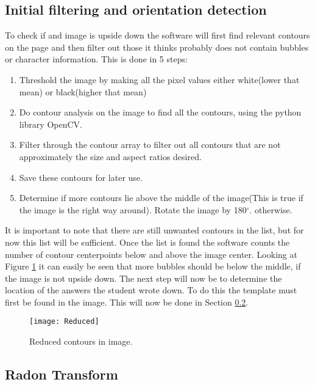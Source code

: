 \subsection{Initial filtering and orientation detection}
\label{sec:InitImageFilter}

To check if and image is upside down the software will first find relevant contours on the page and then filter out those it thinks probably does not contain bubbles or character information. This is done in 5 steps:

\begin{enumerate}
\item Threshold the image by making all the pixel values either white(lower that mean) or black(higher that mean)
\item Do contour analysis on the image to find all the contours, using the python library OpenCV.
\item Filter through the contour array to filter out all contours that are not approximately the size and aspect ratios desired.
\item Save these contours for later use.
\item Determine if more contours lie above the middle of the image(This is true if the image is the right way around). Rotate the image by 180$^{\circ}$. otherwise.
\end{enumerate}

It is important to note that there are still unwanted contours in the list, but for now this list will be sufficient. Once the list is found the software counts the number of contour centerpoints below and above the image center. Looking at Figure \ref{fig:reduced} it can easily be seen that more bubbles should be below the middle, if the image is not upside down. The next step will now be to determine the location of the answers the student wrote down. To do this the template must first be found in the image. This will now be done in Section \ref{sec:RadonTransform}.

\begin{figure}
  \centering
  \texttt{[image: Reduced]}\\
  \caption{Reduced contours in image.}
  \label{fig:reduced}
\end{figure}

\subsection{Radon Transform}
\label{sec:RadonTransform}

